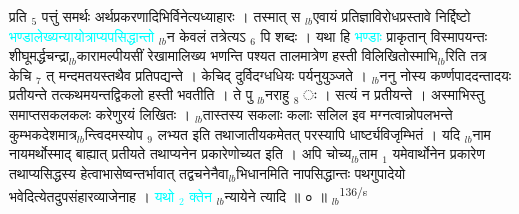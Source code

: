 \documentclass[article,12pt,a4paper]{memoir}%
\newcommand{\quotelemma}[1]{\textcolor{cyan}{#1}}
\newcounter{parCount}
\begin{document}
प्रति {\tiny $_{5}$} पत्तुं समर्थः अर्थप्रकरणादिभिर्विनेत्यध्याहारः । तस्मात् स {\tiny $_{lb}$}एवायं \cite[20a4]{vn-msN} प्रतिज्ञाविरोधप्रस्तावे निर्द्दिष्टो \quotelemma{भण्डालेख्यन्यायोत्राप्यपसिद्धान्तो} {\tiny $_{lb}$}न केवलं तत्रेत्यऽ {\tiny $_{6}$} पि शब्दः । यथा हि \quotelemma{भण्डाः} प्राकृतान् विस्मापयन्तः शीघूमर्द्धचन्द्रा{\tiny $_{lb}$}कारामल्पीयसीं रेखामालिख्य भणन्ति पश्यत तालमात्रेण हस्ती विलिखितोस्माभि{\tiny $_{lb}$}रिति तत्र केचि {\tiny $_{7}$} त् मन्दमतयस्तथैव प्रतिपद्यन्ते । केचिद् दुर्विदग्धधियः पर्यनुयुञ्जते । {\tiny $_{lb}$}ननु नोस्य कर्ण्णपाददन्तादयः प्रतीयन्ते तत्कथमयन्तद्विकलो हस्ती भवतीति । ते पु {\tiny $_{lb}$}नराहु {\tiny $_{8}$} ः । सत्यं न प्रतीयन्ते । अस्माभिस्तु समाप्तसकलकलः करेणुरयं लिखितः । {\tiny $_{lb}$}तास्तस्य सकलाः कलाः सलिल इव मग्नत्वान्नोपलभन्ते कुम्भकदेशमात्र{\tiny $_{lb}$}न्त्विदमस्योप {\tiny $_{9}$} \leavevmode{} लभ्यत इति तथाजातीयकमेतत् परस्यापि धार्ष्ट्यविजृम्भितं । यदि {\tiny $_{lb}$}नाम नायमर्थोस्माद् बाह्यात् प्रतीयते तथाप्यनेन प्रकारेणोच्यत इति । अपि चोच्य{\tiny $_{lb}$}ताम {\tiny $_{1}$} यमेवार्थोनेन प्रकारेण तथाप्यसिद्धस्य हेत्वाभासेष्वन्तर्भावात् तद्वचनेनैवा{\tiny $_{lb}$}भिधानमिति नापसिद्धान्तः पथगुपादेयो भवेदित्येतदुपसंहारव्याजेनाह । \quotelemma{यथो {\tiny $_{2}$} क्तेन} {\tiny $_{lb}$}न्यायेने \cite[20a4]{vn-msN} त्यादि ॥ ० ॥
	{}
	\pend%
      {\tiny $_{lb}$}\textsuperscript{\textenglish{136/s}}
\end{document}
